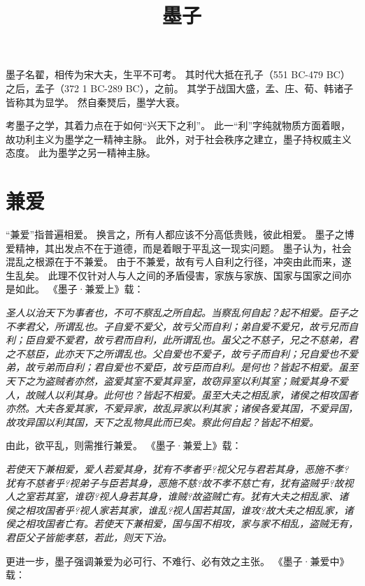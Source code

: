 \documentclass[11pt]{article}
\title{墨子}
\date{}
\begin{document}
  \maketitle
  
  \linenumbers

墨子名翟，相传为宋大夫，生平不可考。
其时代大抵在孔子（551 BC-479 BC）之后，孟子（372 1 BC-289 BC），之前。
其学于战国大盛，孟、庄、荀、韩诸子皆称其为显学。
然自秦燹后，墨学大衰。

\par

考墨子之学，其着力点在于如何“兴天下之利”。
此一“利”字纯就物质方面着眼，故功利主义为墨学之一精神主脉。
此外，对于社会秩序之建立，墨子持权威主义态度。
此为墨学之另一精神主脉。

\section{兼爱}
“兼爱”指普遍相爱。
换言之，所有人都应该不分高低贵贱，彼此相爱。
墨子之博爱精神，其出发点不在于道德，而是着眼于平乱这一现实问题。
墨子认为，社会混乱之根源在于不兼爱。
由于不兼爱，故有亏人自利之行径，冲突由此而来，遂生乱矣。
此理不仅针对人与人之间的矛盾侵害，家族与家族、国家与国家之间亦是如此。
《墨子·兼爱上》载：

\textit{圣人以治天下为事者也，不可不察乱之所自起。当察乱何自起？起不相爱。臣子之不孝君父，所谓乱也。子自爱不爱父，故亏父而自利；弟自爱不爱兄，故亏兄而自利；臣自爱不爱君，故亏君而自利，此所谓乱也。虽父之不慈子，兄之不慈弟，君之不慈臣，此亦天下之所谓乱也。父自爱也不爱子，故亏子而自利；兄自爱也不爱弟，故亏弟而自利；君自爱也不爱臣，故亏臣而自利。是何也？皆起不相爱。虽至天下之为盗贼者亦然，盗爱其室不爱其异室，故窃异室以利其室；贼爱其身不爱人，故贼人以利其身。此何也？皆起不相爱。虽至大夫之相乱家，诸侯之相攻国者亦然。大夫各爱其家，不爱异家，故乱异家以利其家；诸侯各爱其国，不爱异国，故攻异国以利其国，天下之乱物具此而已矣。察此何自起？皆起不相爱。}

由此，欲平乱，则需推行兼爱。
《墨子·兼爱上》载：

\textit{若使天下兼相爱，爱人若爱其身，犹有不孝者乎?视父兄与君若其身，恶施不孝?犹有不慈者乎?视弟子与臣若其身，恶施不慈?故不孝不慈亡有，犹有盗贼乎?故视人之室若其室，谁窃?视人身若其身，谁贼?故盗贼亡有。犹有大夫之相乱家、诸侯之相攻国者乎?视人家若其家，谁乱?视人国若其国，谁攻?故大夫之相乱家，诸侯之相攻国者亡有。若使天下兼相爱，国与国不相攻，家与家不相乱，盗贼无有，君臣父子皆能孝慈，若此，则天下治。}

更进一步，墨子强调兼爱为必可行、不难行、必有效之主张。
《墨子·兼爱中》载：
\end{document}
